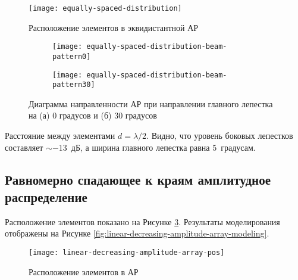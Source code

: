 \begin{figure}[!ht]
    \centering
    \texttt{[image: equally-spaced-distribution]}
    \caption{Расположение элементов в эквидистантной АР}
    \label{fig:equally-spaced-distribution-pos-modeling}
\end{figure}



\begin{figure}[!ht]
    \centering
    \begin{subfigure}[b]{0.49\textwidth}
        \centering
        \hspace*{-3ex}
        \texttt{[image: equally-spaced-distribution-beam-pattern0]}
        \caption{}%
    \end{subfigure}
    \hfill
    \begin{subfigure}[b]{0.49\textwidth}
        \centering
        \hspace*{-3ex}
        \texttt{[image: equally-spaced-distribution-beam-pattern30]}
        \caption{}%
    \end{subfigure}
    \caption{%
    Диаграмма направленности АР при направлении главного лепестка на (а) 0 градусов и (б) 30 градусов
    }%
    \label{fig:equally-spaced-distribution-modeling}
\end{figure}

Расстояние между элементами $d=\lambda/2$. Видно, что уровень боковых лепестков составляет $\sim-13$~дБ, 
а ширина главного лепестка равна 5~градусам.

\subsection{Равномерно спадающее к краям амплитудное распределение}

Расположение элементов показано на Рисунке \ref{fig:linear-decreasing-amplitude-array-pos}. Результаты моделирования отображены на Рисунке \ref{fig:linear-decreasing-amplitude-array-modeling}.

\begin{figure}[!ht]
    \centering
    \texttt{[image: linear-decreasing-amplitude-array-pos]}
    \caption{Расположение элементов в АР}
    \label{fig:linear-decreasing-amplitude-array-pos}
\end{figure}


